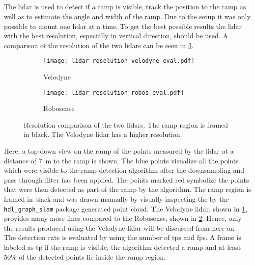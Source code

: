 \subsection{}
The \gls{lidar} is used to detect if a ramp is visible, track the position to the ramp as well as to estimate the angle and width of the ramp.
Due to the setup it was only possible to mount one \gls{lidar} at a time.
To get the best possible results the \gls{lidar} with the best resolution, especially in vertical direction, should be used.
A comparison of the resolution of the two \glspl{lidar} can be seen in \cref{fig:lidar_resolution_eval}.
\begin{figure}[htbp]
    \centering
    \begin{subfigure}{1\textwidth}
        \centering
        \texttt{[image: lidar\_resolution\_velodyne\_eval.pdf]}
        \caption{Velodyne}
        \label{fig:lidar_resolution_velodyne_eval}
    \end{subfigure}
    
    \begin{subfigure}{1\textwidth}
        \centering
        \texttt{[image: lidar\_resolution\_robos\_eval.pdf]}
        \caption{Robosense}
        \label{fig:lidar_resolution_robos_eval}
    \end{subfigure}
    \caption{Resolution comparison of the two \glspl{lidar}. The ramp region is framed in black. The Velodyne \gls{lidar} has a higher resolution.}
    \label{fig:lidar_resolution_eval}
\end{figure}
Here, a top-down view on the ramp of the points measured by the \gls{lidar} at a distance of \SI{7}{\metre} to the ramp is shown.
The blue points visualize all the points which were visible to the ramp detection algorithm after the downsampling and pass through filter has been applied.
The points marked red symbolize the points that were then detected as part of the ramp by the algorithm.
The ramp region is framed in black and was drawn manually by visually inspecting the by the \texttt{hdl\_graph\_slam} package generated point cloud.
The Velodyne \gls{lidar}, shown in \cref{fig:lidar_resolution_velodyne_eval}, provides many more lines compared to the Robosense, shown in \cref{fig:lidar_resolution_robos_eval}.
Hence, only the results produced using the Velodyne \gls{lidar} will be discussed from here on.\\
The detection rate is evaluated by using the number of \glspl{tp} and \glspl{fp}.
A frame is labeled as \gls{tp} if the ramp is visible, the algorithm detected a ramp and at least 50\% of the detected points lie inside the ramp region.
